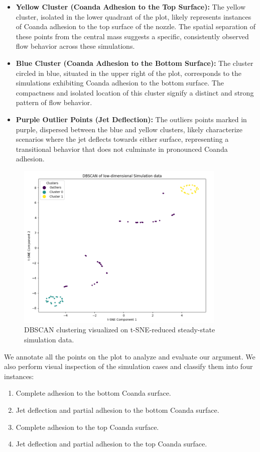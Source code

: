 \begin{itemize}
  \item \textbf{Yellow Cluster (Coanda Adhesion to the Top Surface):} The yellow cluster, isolated in the lower quadrant of the plot, likely represents instances of Coanda adhesion to the top surface of the nozzle. The spatial separation of these points from the central mass suggests a specific, consistently observed flow behavior across these simulations.
  \item \textbf{Blue Cluster (Coanda Adhesion to the Bottom Surface):} The cluster circled in blue, situated in the upper right of the plot, corresponds to the simulations exhibiting Coanda adhesion to the bottom surface. The compactness and isolated location of this cluster signify a distinct and strong pattern of flow behavior.
  \item \textbf{Purple Outlier Points (Jet Deflection):} The outliers points marked in purple, dispersed between the blue and yellow clusters, likely characterize scenarios where the jet deflects towards either surface, representing a transitional behavior that does not culminate in pronounced Coanda adhesion.
\end{itemize}
\begin{figure}[ht]
    \centering
    \includegraphics[width=10cm]{images/Clustering/dbscan_sim.png}
    \caption{DBSCAN clustering visualized on t-SNE-reduced steady-state simulation data.}
    \label{dbscan_tsne}
\end{figure}
We annotate all the points on the plot to analyze and evaluate our argument. We also perform visual inspection of the simulation cases and classify them into four instances:  
\begin{enumerate}
    \item Complete adhesion to the bottom Coanda surface. 
    \item Jet deflection and partial adhesion to the bottom Coanda surface. 
    \item Complete adhesion to the top Coanda surface. 
    \item Jet deflection and partial adhesion to the top Coanda surface. 
\end{enumerate}
